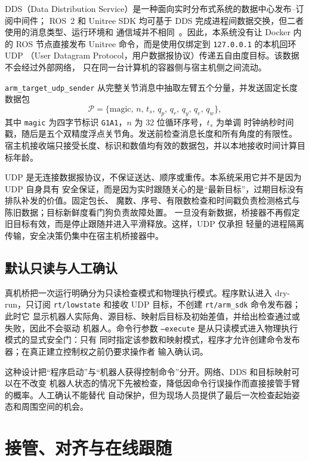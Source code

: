 DDS（Data Distribution Service）是一种面向实时分布式系统的数据中心发布--订阅中间件；
ROS~2 和 Unitree SDK 均可基于 DDS 完成进程间数据交换，但二者使用的消息类型、运行环境和
通信域并不相同~\cite{maruyama2016ros2,omg2015dds}。因此，本系统没有让 Docker 内的 ROS
节点直接发布 Unitree 命令，而是使用仅绑定到 \texttt{127.0.0.1} 的本机回环 UDP
（User Datagram Protocol，用户数据报协议）传递五自由度目标。该数据不会经过外部网络，
只在同一台计算机的容器侧与宿主机侧之间流动。

\texttt{arm\_target\_udp\_sender} 从完整关节消息中抽取左臂五个分量，并发送固定长度数据包
\begin{equation}
  \mathcal P=
  \{\text{magic},\,n,\,t_s,\,q_p,\,q_r,\,q_y,\,q_e,\,q_w\},
  \label{eq:ch5_udp_packet}
\end{equation}
其中 \texttt{magic} 为四字节标识 \texttt{G1A1}，$n$ 为 32 位循环序号，$t_s$ 为单调
时钟纳秒时间戳，随后是五个双精度浮点关节角。发送前检查消息长度和所有角度的有限性。
宿主机接收端只接受长度、标识和数值均有效的数据包，并以本地接收时间计算目标年龄。

UDP 是无连接数据报协议，不保证送达、顺序或重传。本系统采用它并不是因为 UDP 自身具有
安全保证，而是因为实时跟随关心的是“最新目标”，过期目标没有排队补发的价值。固定包长、
魔数、序号、有限数检查和时间戳负责检测格式与陈旧数据；目标新鲜度看门狗负责故障处置。
一旦没有新数据，桥接器不再假定旧目标有效，而是停止跟随并进入平滑释放。这样，UDP 仅承担
轻量的进程隔离传输，安全决策仍集中在宿主机桥接器中。

\subsection{默认只读与人工确认}
\label{subsec:ch5_dry_run_confirmation}

真机桥把一次运行明确分为只读检查模式和物理执行模式。程序默认进入 dry-run，只订阅
\texttt{rt/lowstate} 和接收 UDP 目标，不创建 \texttt{rt/arm\_sdk} 命令发布器；此时它
显示机器人实际角、源目标、映射后目标及初始差值，并给出检查通过或失败，因此不会驱动
机器人。命令行参数 \texttt{--execute} 是从只读模式进入物理执行模式的显式安全门：只有
同时指定该参数和映射模式，程序才允许创建命令发布器；在真正建立控制权之前仍要求操作者
输入确认词。

这种设计把“程序启动”与“机器人获得控制命令”分开。网络、DDS 和目标映射可以在不改变
机器人状态的情况下先被检查，降低因命令行误操作而直接接管手臂的概率。人工确认不能替代
自动保护，但为现场人员提供了最后一次检查起始姿态和周围空间的机会。

\section{接管、对齐与在线跟随}
\label{sec:ch5_takeover_tracking}

